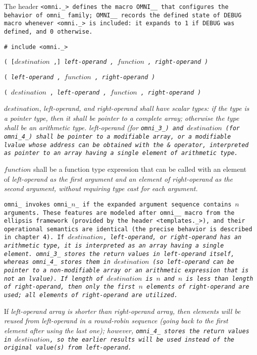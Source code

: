 The header \tt{<omni._>} defines the macro \tt{OMNI__} that configures
the behavior of \tt{omni_} family; \tt{OMNI__} records the \tt{defined}
state of \tt{DEBUG} macro whenever \tt{<omni._>} is included:
it expands to \tt{1} if \tt{DEBUG} was defined, and \tt{0} otherwise.


\tt{# include <omni._>}

\s\s\s\tt{(} [$destination$ \tt{,}]
\it{left-operand} \tt{,} $function$ \tt{,} \it{right-operand} \tt{)}

\s\tt{(} \phantom{[}\it{left-operand} \tt{,}\phantom{]}
$function$ \tt{,} \it{right-operand} \tt{)}

\s\tt{(} \phantom{[}$destination$ \tt{,}\phantom{]}
\it{left-operand} \tt{,} $function$ \tt{,} \it{right-operand} \tt{)}


$destination$, \it{left-operand}, and \it{right-operand} shall have
scalar types: if the type is a pointer type, then it shall be pointer
to a complete array; otherwise the type shall be an arithmetic type.
\it{left-operand} (for \tt{omni_3_}) and $destination$ (for \tt{omni_4_})
shall be pointer to a modifiable array, or a modifiable lvalue whose
address can be obtained with the \tt{&} operator, interpreted as
pointer to an array having a single element of arithmetic type.

$function$ shall be a function type expression that can be called with an element
of \it{left-operand} as the first argument and an element of \it{right-operand}
as the second argument, without requiring type cast for each argument.


\tt{omni_} invokes \tt{omni_}$n$\_ if the
expanded argument sequence contains $n$ arguments.
These features are modeled after  \tt{omni__} macro from the ellipsis
framework (provided by the header \tt{<templates._>}), and their operational
semantics are identical (the precise behavior is described in chapter 4).
If $destination$, \it{left-operand}, or \it{right-operand} has an
arithmetic type, it is interpreted as an array having a single element.
\tt{omni_3_} stores the return values in \it{left-operand} itself, whereas
\tt{omni_4_} stores them in $destination$ (so \it{left-operand} can be pointer
to a non-modifiable array or an arithmetic expression that is not an lvalue).
If length of $destination$ is $n$ and $n$ is less than length of
\it{right-operand}, then only the first $n$ elements of \it{right-operand}
are used; all elements of \it{right-operand} are utilized.

\note If \it{left-operand} array is shorter than \it{right-operand} array,
then elements will be reused from \it{left-operand} in a round-robin sequence
(going back to the first element after using the last one);
however, \tt{omni_4_} stores the return values in $destination$, so the earlier
results will be used instead of the original value(s) from \it{left-operand}.
